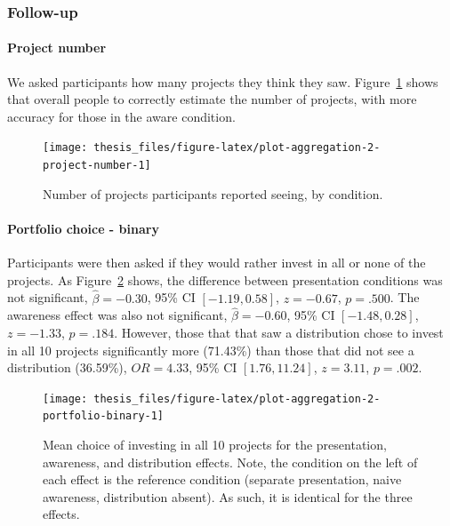 \documentclass[a4paper, nobind, dvipsnames]{templates/ociamthesis}
\theoremstyle{definition}
\theoremstyle{definition}
\theoremstyle{definition}
\theoremstyle{definition}
\theoremstyle{remark}
\begin{document}
\hypertarget{follow-up-1}{%
\subsubsection{Follow-up}\label{follow-up-1}}

\hypertarget{project-number}{%
\paragraph{Project number}\label{project-number}}

We asked participants how many projects they think they saw.
Figure~\ref{fig:plot-aggregation-2-project-number} shows that overall people
to correctly estimate the number of projects, with more accuracy for those in
the aware condition.



\begin{figure}
\texttt{[image: thesis\_files/figure-latex/plot-aggregation-2-project-number-1]} \caption{Number of projects participants reported seeing, by condition.}\label{fig:plot-aggregation-2-project-number}
\end{figure}

\hypertarget{portfolio-choice---binary}{%
\paragraph{Portfolio choice - binary}\label{portfolio-choice---binary}}

Participants were then asked if they would rather invest in all or none of the
projects. As Figure~\ref{fig:plot-aggregation-2-portfolio-binary} shows, the
difference between presentation conditions was not significant,
\(\hat{\beta} = -0.30\), 95\% CI \([-1.19, 0.58]\), \(z = -0.67\), \(p = .500\). The
awareness effect was also not significant,
\(\hat{\beta} = -0.60\), 95\% CI \([-1.48, 0.28]\), \(z = -1.33\), \(p = .184\). However,
those that that saw a distribution chose to invest in all 10 projects
significantly more
(71.43\%) than
those that did not see a distribution
(36.59\%),
\(OR = 4.33\), 95\% CI \([1.76, 11.24]\), \(z = 3.11\), \(p = .002\).



\begin{figure}
\texttt{[image: thesis\_files/figure-latex/plot-aggregation-2-portfolio-binary-1]} \caption{Mean choice of investing in all 10 projects for the presentation, awareness, and distribution effects. Note, the condition on the left of each effect is the reference condition (separate presentation, naive awareness, distribution absent). As such, it is identical for the three effects.}\label{fig:plot-aggregation-2-portfolio-binary}
\end{figure}
\end{document}
